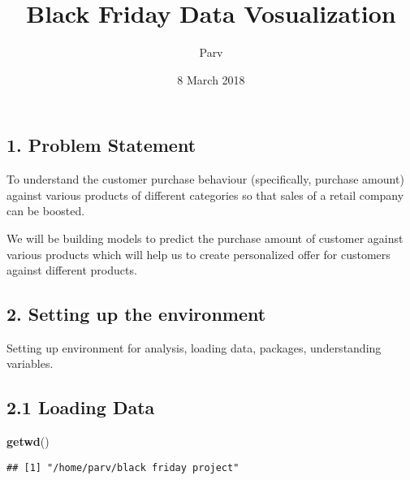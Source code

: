 \documentclass[]{article}
\title{Black Friday Data Vosualization}
\author{Parv}
\date{8 March 2018}
\newenvironment{Shaded}{\begin{snugshade}}{\end{snugshade}}
\newcommand{\KeywordTok}[1]{\textcolor[rgb]{0.13,0.29,0.53}{\textbf{#1}}}
\newcommand{\NormalTok}[1]{#1}
\begin{document}
\maketitle

\subsection{1. Problem Statement}\label{problem-statement}

To understand the customer purchase behaviour (specifically, purchase
amount) against various products of different categories so that sales
of a retail company can be boosted.

We will be building models to predict the purchase amount of customer
against various products which will help us to create personalized offer
for customers against different products.

\subsection{2. Setting up the
environment}\label{setting-up-the-environment}

Setting up environment for analysis, loading data, packages,
understanding variables.

\subsection{2.1 Loading Data}\label{loading-data}

\begin{Shaded}
\begin{Highlighting}[]
\KeywordTok{getwd}\NormalTok{()}
\end{Highlighting}
\end{Shaded}

\begin{verbatim}
## [1] "/home/parv/black friday project"
\end{verbatim}
\end{document}
